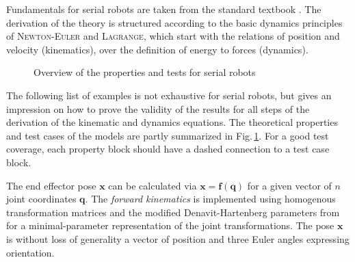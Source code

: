 \documentclass[runningheads]{llncs}
\begin{document}
%
%


Fundamentals for serial robots are taken from the standard textbook \cite{KhalilDom2002}.
The derivation of the theory is structured according to the basic dynamics principles of \textsc{Newton-Euler} and \textsc{Lagrange}, which start with the relations of position and velocity (kinematics), over the definition of energy to forces (dynamics).

\begin{figure}[tb]
	
	\caption{Overview of the properties and tests for serial robots}
	\label{fig:test_coverage_serrob}
\end{figure} 

The following list of examples is not exhaustive for serial robots, but gives an impression on how to prove the validity of the results for all steps of the derivation of the kinematic and dynamics equations.
The theoretical properties and test cases of the models are partly summarized in Fig.\,\ref{fig:test_coverage_serrob}.
For a good test coverage, each property block should have a dashed connection to a test case block.




\begin{property}\label{prop:ser_kin}
The end effector pose $\bm{x}$ can be calculated via $\bm{x}{=}\bm{f}(\bm{q})$ for a given vector of $n$ joint coordinates $\bm{q}$.
The \emph{forward kinematics} is implemented using homogenous transformation matrices and the modified Denavit-Hartenberg parameters from \cite{KhalilDom2002} for a minimal-parameter representation of the joint transformations.
The pose $\bm{x}$ is without loss of generality a vector of position and three Euler angles expressing orientation.
\end{property}
\end{document}
